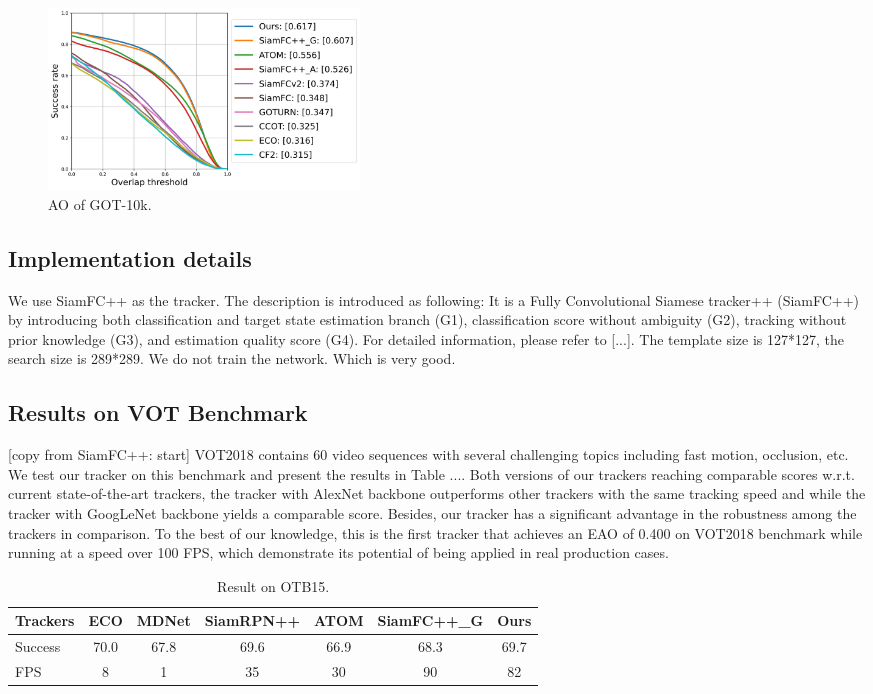 \documentclass[journal]{IEEEtran}
\begin{document}
\begin{figure}[t]
    \centering
    \includegraphics[width=0.4\textwidth]{images/got10k/got10k_ao.pdf}
    \caption{AO of GOT-10k.}
\end{figure}

\subsection{Implementation details}
We use SiamFC++ as the tracker. The description is introduced as following:
It is a Fully Convolutional Siamese tracker++ (SiamFC++) by introducing both classification and target state estimation branch (G1), classification score without ambiguity (G2), tracking without prior knowledge (G3), and estimation quality score (G4).
For detailed information, please refer to [...].
The template size is 127*127, the search size is 289*289.
We do not train the network. Which is very good.

\subsection{Results on VOT Benchmark}
[copy from SiamFC++: start]
VOT2018 contains 60 video sequences with several challenging topics including fast motion, occlusion, etc. We test our tracker on this benchmark and present the results in Table .... Both versions of our trackers reaching comparable scores w.r.t. current state-of-the-art trackers, the tracker with AlexNet backbone outperforms other trackers with the same tracking speed and while the tracker with GoogLeNet backbone yields a comparable score. Besides, our tracker has a significant advantage in the robustness among the trackers in comparison. To the best of our knowledge, this is the first tracker that achieves an EAO of 0.400 on VOT2018 benchmark while running at a speed over 100 FPS, which demonstrate its potential of being applied in real production cases.

\begin{table}[t]
\caption{Result on OTB15.}
\setlength{\tabcolsep}{3pt}
\begin{center}
\begin{tabular}{l | c c c c c c}
\toprule
Trackers & ECO  & MDNet & SiamRPN++ & ATOM & SiamFC++\_G & Ours \\
\midrule
Success & 70.0 & 67.8  & 69.6      & 66.9      & 68.3       & 69.7 \\
FPS     & 8    & 1     & 35        & 30       & 90         & 82  \\
\bottomrule
\end{tabular}
\end{center}
\end{table}
\end{document}
